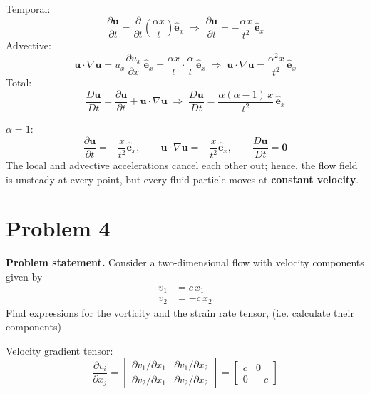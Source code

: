 \documentclass[11pt]{article}
\newcommand{\pd}[2]{\frac{\partial #1}{\partial #2}}
\newcommand{\vect}[1]{\mathbf{#1}}
\begin{document}
\medskip
\noindent Temporal:
\begin{equation*}
\pd{\vect u}{t} = \pd{}{t}\left(\frac{\alpha x}{t}\right)\hat{\vect e}_x
\;\Rightarrow\;
\boxed{\pd{\vect u}{t} = -\frac{\alpha x}{t^2}\,\hat{\vect e}_x}
\end{equation*}
Advective:
\begin{equation*}
\vect u\cdot\nabla\vect u = u_x\pd{u_x}{x}\,\hat{\vect e}_x = \frac{\alpha x}{t}\cdot\frac{\alpha}{t}\,\hat{\vect e}_x
\;\Rightarrow\;
\boxed{\vect u\cdot\nabla\vect u = \frac{\alpha^2 x}{t^2}\,\hat{\vect e}_x}
\end{equation*}
Total:
\begin{equation*}
\frac{D\vect u}{Dt} = \pd{\vect u}{t} + \vect u\cdot\nabla\vect u
\;\Rightarrow\;
\boxed{\frac{D\vect u}{Dt} = \frac{\alpha(\alpha-1)\,x}{t^2}\,\hat{\vect e}_x}
\end{equation*}

\noindent $\alpha = 1$:
\begin{equation*}
\pd{\vect u}{t} = -\frac{x}{t^2}\hat{\vect e}_x, \qquad
\vect u\cdot\nabla\vect u = +\frac{x}{t^2}\hat{\vect e}_x, \qquad
\boxed{\frac{D\vect u}{Dt} = \vect 0}
\end{equation*}
The local and advective accelerations cancel each other out; hence, the flow field is unsteady at every point, but every
fluid particle moves at \textbf{constant velocity}.

\section*{Problem 4}

\noindent\textbf{Problem statement.} Consider a two-dimensional flow with velocity components given by
\begin{align*}
v_1 &= c\,x_1 \\
v_2 &= -c\,x_2
\end{align*}
Find expressions for the vorticity and the strain rate tensor, (i.e. calculate their components)

\medskip
\noindent Velocity gradient tensor:
\begin{equation*}
\pd{v_i}{x_j} =
\begin{bmatrix}
\partial v_1/\partial x_1 & \partial v_1/\partial x_2 \\
\partial v_2/\partial x_1 & \partial v_2/\partial x_2
\end{bmatrix}
=
\begin{bmatrix}
c & 0 \\
0 & -c
\end{bmatrix}
\end{equation*}
\end{document}
